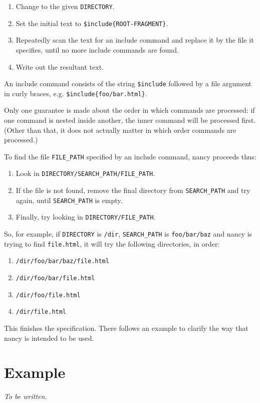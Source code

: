 \documentclass[english]{scrartcl}
\begin{document}
\begin{enumerate}
\item Change to the given \texttt{DIRECTORY}.
\item Set the initial text to \texttt{\$include\{ROOT-FRAGMENT\}}.
\item Repeatedly scan the text for an include command and replace it by the file it specifies, until no more include commands are found.\item Write out the resultant text.
\end{enumerate}

An include command consists of the string \texttt{\$include} followed by a file argument in curly braces, e.g. \texttt{\$include\{foo/bar.html\}}.

Only one guarantee is made about the order in which commands are processed: if one command is nested inside another, the inner command will be processed first. (Other than that, it does not actually matter in which order commands are processed.)

To find the file \texttt{FILE\_PATH} specified by an include command, nancy proceeds thus:

\begin{enumerate}
\item Look in \texttt{DIRECTORY/SEARCH\_PATH/FILE\_PATH}.\item If the file is not found, remove the final directory from \texttt{SEARCH\_PATH} and try again, until \texttt{SEARCH\_PATH} is empty.\item Finally, try looking in \texttt{DIRECTORY/FILE\_PATH}.
\end{enumerate}

So, for example, if \texttt{DIRECTORY} is \texttt{/dir}, \texttt{SEARCH\_PATH} is \texttt{foo/bar/baz} and nancy is trying to find \texttt{file.html}, it will try the following directories, in order:

\begin{enumerate}
\item \texttt{/dir/foo/bar/baz/file.html}\item \texttt{/dir/foo/bar/file.html}\item \texttt{/dir/foo/file.html}\item \texttt{/dir/file.html}
\end{enumerate}

This finishes the specification. There follows an example to clarify the way that nancy is intended to be used.

\section*{Example}

\emph{To be written.}
\end{document}
